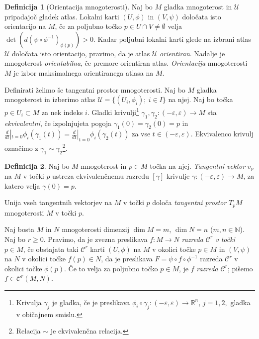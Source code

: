 \documentclass[12pt,a4paper,twoside]{article}
\theoremstyle{definition} %
\newtheorem{definicija}{Definicija}[section]
\theoremstyle{plain} %
\numberwithin{equation}{section}  %
\newcommand{\N}{\mathbb N}
\begin{document}
\begin{definicija} [Orientacija mnogoterosti]
Naj bo $M$ gladka mnogoterost in $\mathcal{U}$ pripadajoč gladek atlas. Lokalni karti $(U, \phi)$ in $(V, \psi)$ določata isto orientacijo na $M$, če za poljubno točko $p \in U \cap V \neq \emptyset$ velja $\det (d(\psi \circ \phi ^{-1})_{\phi (p)}) > 0.$ Kadar poljubni lokalni karti glede na izbrani atlas $\mathcal{U}$ določata isto orientacijo, pravimo, da je atlas $\mathcal{U}$ \emph{orientiran}. Nadalje je mnogoterost \emph{orientabilna}, če premore orientiran atlas. \emph{Orientacija} mnogoterosti $M$ je izbor maksimalnega orientiranega atlasa na $M$.
\end{definicija}

Definirati želimo še tangentni prostor mnogoterosti. Naj bo $M$ gladka mnogoterost in izberimo atlas $\mathcal{U} = \{ (U_{i}, \phi_{i}) ; \ i \in I \}$ na njej. Naj bo točka $p \in U_{i} \subset M$ za nek indeks $i$.  Gladki krivulji\footnote{Krivulja $\gamma_{j}$ je gladka, če je preslikava $ \phi_{i} \circ \gamma_{j} \colon (-\varepsilon, \varepsilon) \to \mathbb{R}^{n}$, $j=1,2,$ gladka v običajnem smislu.} 
$\gamma_{1}, \gamma_{2} \colon (-\varepsilon, \varepsilon) \to M$ sta \emph{ekvivalentni}, če izpolnjujeta pogoja
$\gamma_{1}(0) = \gamma_{2}(0) = p$ in $ \frac{d}{dt}|_{t=0} \phi_{i}(\gamma_{1}(t)) =  \frac{d}{dt}|_{t=0} \phi_{i}(\gamma_{2}(t))$ za vse $t \in (-\varepsilon, \varepsilon)$. Ekvivalenco krivulj označimo z $\gamma_{1} \sim \gamma_{2}$\footnote{Relacija $\sim$ je ekvivalenčna relacija.}.

\begin{definicija}
Naj bo $M$ mnogoterost in $p \in M$ točka na njej. \emph{Tangentni vektor} $v_{p}$ na $M$ v točki $p$ ustreza ekvivalenčnemu razredu $[\gamma]$ krivulje $\gamma \colon (-\varepsilon, \varepsilon) \to M$, za katero velja $\gamma (0) = p$.

Unija vseh tangentnih vektorjev na $M$ v točki $p$ določa \emph{tangentni prostor} $T_{p}M$ mnogoterosti $M$ v točki $p$.
\end{definicija}

Naj bosta $M$ in $N$ mnogoterosti dimenzij $\dim M = m$, $\dim N = n$ ($m, n \in \N$). Naj bo $r \geq 0$. Pravimo, da je zvezna preslikava $f \colon M \to N$ \emph{razreda $\mathcal{C}^{r}$ v točki} $p \in M$, če obstajata taki $\mathcal{C}^{r}$ karti $(U, \phi)$ na $M$ v okolici točke $p \in M$ in $(V, \psi)$ na $N$ v okolici točke $f(p) \in N$, da je preslikava $F = \psi \circ f \circ \phi^{-1}$ razreda $\mathcal{C}^{r}$ v okolici točke $\phi(p)$.
Če to velja za poljubno točko $p \in M$, je $f$ \emph{razreda $\mathcal{C}^{r}$}; pišemo $f \in  \mathcal{C}^{r}(M,N)$.
\end{document}
